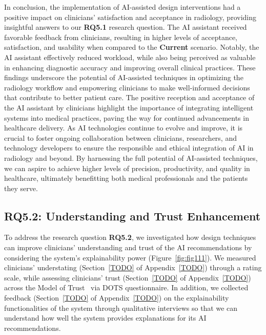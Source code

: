 In conclusion, the implementation of \ac{AI}-assisted design interventions had a positive impact on clinicians' satisfaction and acceptance in radiology, providing insightful answers to our {\bf RQ5.1} research question.
The \ac{AI} assistant received favorable feedback from clinicians, resulting in higher levels of acceptance, satisfaction, and usability when compared to the {\bf Current} scenario.
Notably, the \ac{AI} assistant effectively reduced workload, while also being perceived as valuable in enhancing diagnostic accuracy and improving overall clinical practices.
These findings underscore the potential of \ac{AI}-assisted techniques in optimizing the radiology workflow and empowering clinicians to make well-informed decisions that contribute to better patient care.
The positive reception and acceptance of the \ac{AI} assistant by clinicians highlight the importance of integrating intelligent systems into medical practices, paving the way for continued advancements in healthcare delivery.
As \ac{AI} technologies continue to evolve and improve, it is crucial to foster ongoing collaboration between clinicians, researchers, and technology developers to ensure the responsible and ethical integration of \ac{AI} in radiology and beyond.
By harnessing the full potential of \ac{AI}-assisted techniques, we can aspire to achieve higher levels of precision, productivity, and quality in healthcare, ultimately benefitting both medical professionals and the patients they serve.

\subsection{RQ5.2: Understanding and Trust Enhancement}
\label{sec:chap005006002}

To address the research question {\bf RQ5.2}, we investigated how design techniques can improve clinicians' understanding and trust of the \ac{AI} recommendations by considering the system's explainability power (Figure~\ref{fig:fig111}).
We measured clinicians' understating (Section~\ref{TODO} of Appendix~\ref{TODO}) through a rating scale, while assessing clinicians' trust (Section~\ref{TODO} of Appendix~\ref{TODO}) across the Model of Trust~\cite{schoorman2016perspective} via \ac{DOTS} questionnaire.
In addition, we collected feedback (Section~\ref{TODO} of Appendix~\ref{TODO}) on the explainability functionalities of the system through qualitative interviews so that we can understand how well the system provides explanations for its \ac{AI} recommendations.

